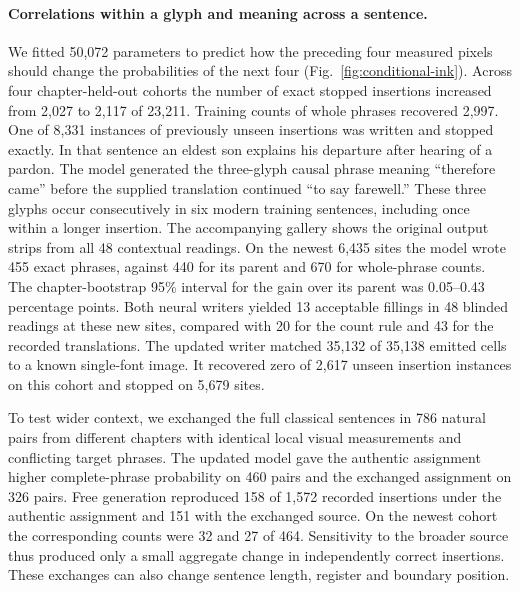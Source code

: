 \paragraph{Correlations within a glyph and meaning across a sentence.}
We fitted 50,072 parameters to predict how the preceding four measured pixels should change the probabilities of the next four (Fig.~\ref{fig:conditional-ink}). Across four chapter-held-out cohorts the number of exact stopped insertions increased from 2,027 to 2,117 of 23,211. Training counts of whole phrases recovered 2,997. One of 8,331 instances of previously unseen insertions was written and stopped exactly. In that sentence an eldest son explains his departure after hearing of a pardon. The model generated the three-glyph causal phrase meaning “therefore came” before the supplied translation continued “to say farewell.” These three glyphs occur consecutively in six modern training sentences, including once within a longer insertion. The accompanying gallery shows the original output strips from all 48 contextual readings. On the newest 6,435 sites the model wrote 455 exact phrases, against 440 for its parent and 670 for whole-phrase counts. The chapter-bootstrap 95\% interval for the gain over its parent was 0.05--0.43 percentage points. Both neural writers yielded 13 acceptable fillings in 48 blinded readings at these new sites, compared with 20 for the count rule and 43 for the recorded translations. The updated writer matched 35,132 of 35,138 emitted cells to a known single-font image. It recovered zero of 2,617 unseen insertion instances on this cohort and stopped on 5,679 sites.

To test wider context, we exchanged the full classical sentences in 786 natural pairs from different chapters with identical local visual measurements and conflicting target phrases. The updated model gave the authentic assignment higher complete-phrase probability on 460 pairs and the exchanged assignment on 326 pairs. Free generation reproduced 158 of 1,572 recorded insertions under the authentic assignment and 151 with the exchanged source. On the newest cohort the corresponding counts were 32 and 27 of 464. Sensitivity to the broader source thus produced only a small aggregate change in independently correct insertions. These exchanges can also change sentence length, register and boundary position.

